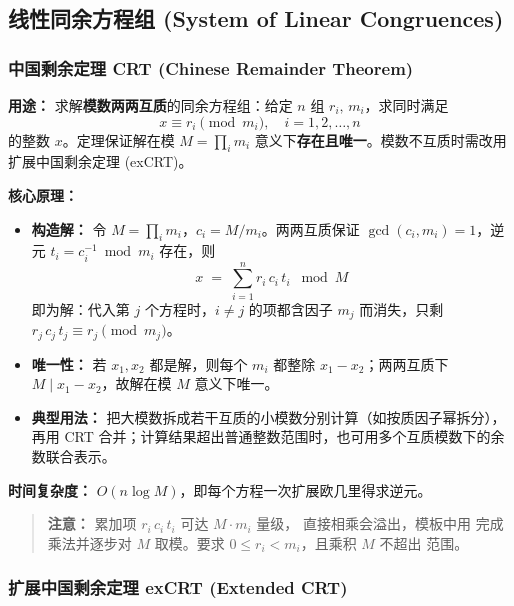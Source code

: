 \subsection{线性同余方程组 (System of Linear Congruences)}

\subsubsection{中国剩余定理 CRT (Chinese Remainder Theorem)}

\textbf{用途：}
求解\textbf{模数两两互质}的同余方程组：给定 $n$ 组 $r_i,\, m_i$，求同时满足
\[ x \equiv r_i \pmod{m_i}, \quad i = 1, 2, \dots, n \]
的整数 $x$。定理保证解在模 $M = \prod_{i} m_i$ 意义下\textbf{存在且唯一}。模数不互质时需改用扩展中国剩余定理 (exCRT)。

\textbf{核心原理：}

\begin{itemize}
  \item \textbf{构造解：} 令 $M = \prod_i m_i$，$c_i = M / m_i$。两两互质保证 $\gcd(c_i, m_i) = 1$，逆元 $t_i = c_i^{-1} \bmod m_i$ 存在，则
  \[ x \;=\; \sum_{i=1}^{n} r_i\, c_i\, t_i \;\bmod M \]
  即为解：代入第 $j$ 个方程时，$i \ne j$ 的项都含因子 $m_j$ 而消失，只剩 $r_j\, c_j\, t_j \equiv r_j \pmod{m_j}$。
  \item \textbf{唯一性：} 若 $x_1, x_2$ 都是解，则每个 $m_i$ 都整除 $x_1 - x_2$；两两互质下 $M \mid x_1 - x_2$，故解在模 $M$ 意义下唯一。
  \item \textbf{典型用法：} 把大模数拆成若干互质的小模数分别计算（如按质因子幂拆分），再用 CRT 合并；计算结果超出普通整数范围时，也可用多个互质模数下的余数联合表示。
\end{itemize}

\textbf{时间复杂度：} $O(n \log M)$，即每个方程一次扩展欧几里得求逆元。



\begin{quote}
\textbf{注意：} 累加项 $r_i\, c_i\, t_i$ 可达 $M \cdot m_i$ 量级， 直接相乘会溢出，模板中用  完成乘法并逐步对 $M$ 取模。要求 $0 \le r_i < m_i$，且乘积 $M$ 不超出  范围。
\end{quote}

\subsubsection{扩展中国剩余定理 exCRT (Extended CRT)}

